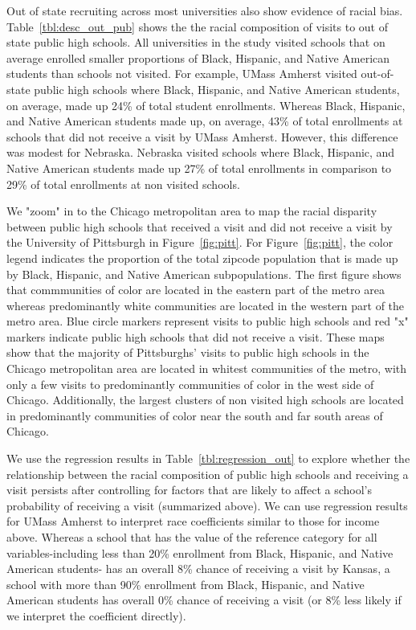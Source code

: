 \documentclass[twoside]{article}
\begin{document}
Out of state recruiting across most universities also show evidence of racial bias. Table~\ref{tbl:desc_out_pub} shows the the racial composition of visits to out of state public high schools. All universities in the study visited schools that on average enrolled smaller proportions of Black, Hispanic, and Native American students than schools not visited. For example, UMass Amherst visited out-of-state public high schools where Black, Hispanic, and Native American students, on average, made up 24\% of total student enrollments. Whereas Black, Hispanic, and Native American students made up, on average, 43\% of total enrollments at schools that did not receive a visit by UMass Amherst. However, this difference was modest for Nebraska. Nebraska visited schools where Black, Hispanic, and Native American students made up 27\% of total enrollments in comparison to 29\% of total enrollments at non visited schools.

We "zoom" in to the Chicago metropolitan area to map the racial disparity between public high schools that received a visit and did not receive a visit by the University of Pittsburgh in Figure~\ref{fig:pitt}. For Figure~\ref{fig:pitt}, the color legend indicates the proportion of the total zipcode population that is made up by Black, Hispanic, and Native American subpopulations. The first figure shows that commmunities of color are located in the eastern part of the metro area whereas predominantly white communities are located in the western part of the metro area. Blue circle markers represent visits to public high schools and red "x" markers indicate public high schools that did not receive a visit. These maps show that the majority of Pittsburghs' visits to public high schools in the Chicago metropolitan area are located in whitest communities of the metro, with only a few visits to predominantly communities of color in the west side of Chicago. Additionally, the largest clusters of non visited high schools are located in predominantly communities of color near the south and far south areas of Chicago.


We use the regression results in Table~\ref{tbl:regression_out} to explore whether the relationship between the racial composition of public high schools and receiving a visit persists after controlling for factors that are likely to affect a school's probability of receiving a visit (summarized above). We can use regression results for UMass Amherst to interpret race coefficients similar to those for income above. Whereas a school that has the value of the reference category for all variables-including less than 20\% enrollment from Black, Hispanic, and Native American students- has an overall 8\% chance of receiving a visit by Kansas, a school with more than 90\% enrollment from Black, Hispanic, and Native American students has overall 0\% chance of receiving a visit (or 8\% less likely if we interpret the coefficient directly). 
\end{document}
